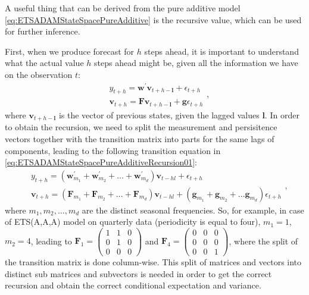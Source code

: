 \documentclass[
]{book}
\theoremstyle{definition}
\theoremstyle{definition}
\theoremstyle{definition}
\theoremstyle{definition}
\theoremstyle{remark}
\begin{document}
A useful thing that can be derived from the pure additive model \eqref{eq:ETSADAMStateSpacePureAdditive} is the recursive value, which can be used for further inference.

First, when we produce forecast for \(h\) steps ahead, it is important to understand what the actual value \(h\) steps ahead might be, given all the information we have on the observation \(t\):
\begin{equation}
  \begin{aligned}
    & {y}_{t+h} = \mathbf{w}^\prime \mathbf{v}_{t+h-\mathbf{l}} + \epsilon_{t+h} \\
    & \mathbf{v}_{t+h} = \mathbf{F} \mathbf{v}_{t+h-\mathbf{l}} + \mathbf{g} \epsilon_{t+h}
  \end{aligned},
  \label{eq:ETSADAMStateSpacePureAdditiveRecursion01}
\end{equation}
where \(\mathbf{v}_{t+h-\mathbf{l}}\) is the vector of previous states, given the lagged values \(\mathbf{l}\). In order to obtain the recursion, we need to split the measurement and persisitence vectors together with the transition matrix into parts for the same lags of components, leading to the following transition equation in \eqref{eq:ETSADAMStateSpacePureAdditiveRecursion01}:
\begin{equation}
  \begin{aligned}
    & {y}_{t+h} = (\mathbf{w}_{m_1}^\prime + \mathbf{w}_{m_2}^\prime + \dots + \mathbf{w}_{m_d}^\prime) \mathbf{v}_{t-h{l}} + \epsilon_{t+h} \\
    & \mathbf{v}_{t+h} = (\mathbf{F}_{m_1} + \mathbf{F}_{m_2} + \dots + \mathbf{F}_{m_d}) \mathbf{v}_{t-h{l}} + (\mathbf{g}_{m_1} + \mathbf{g}_{m_2} + \dots \mathbf{g}_{m_d}) \epsilon_{t+h}
  \end{aligned},
  \label{eq:ETSADAMStateSpacePureAdditiveRecursion02}
\end{equation}
where \(m_1, m_2, \dots, m_d\) are the distinct seasonal frequencies. So, for example, in case of ETS(A,A,A) model on quarterly data (periodicity is equal to four), \(m_1=1\), \(m_2=4\), leading to \(\mathbf{F}_{1} = \begin{pmatrix} 1 & 1 & 0 \\ 0 & 1 & 0 \\ 0 & 0 & 0 \end{pmatrix}\) and \(\mathbf{F}_{4} = \begin{pmatrix} 0 & 0 & 0 \\ 0 & 0 & 0 \\ 0 & 0 & 1 \end{pmatrix}\), where the split of the transition matrix is done column-wise. This split of matrices and vectors into distinct sub matrices and subvectors is needed in order to get the correct recursion and obtain the correct conditional expectation and variance.
\end{document}
